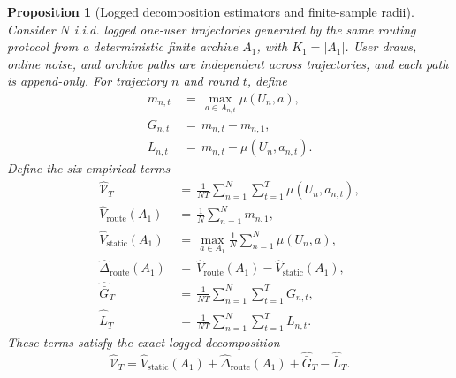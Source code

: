 \documentclass{article} %
\newtheorem{proposition}[theorem]{Proposition}
\begin{document}
\begin{proposition}[Logged decomposition estimators and finite-sample radii]
\label{prop:16}
Consider \(N\) i.i.d. logged one-user trajectories generated by the same
routing protocol from a deterministic finite archive \(A_1\), with
\(K_1=|A_1|\). User draws, online noise, and archive paths are independent
across trajectories, and each path is append-only. For trajectory \(n\) and
round \(t\), define
\begin{align}
\label{eq:app-six-logged-m}
m_{n,t}
&\,=\,
\max_{a\in A_{n,t}}\mu(U_n,a),
\\
\label{eq:app-six-logged-G}
G_{n,t}
&\,=\,
m_{n,t}-m_{n,1},
\\
\label{eq:app-six-logged-L}
L_{n,t}
&\,=\,
m_{n,t}-\mu(U_n,a_{n,t}).
\end{align}
Define the six empirical terms
\begin{align}
\label{eq:app-six-hat-value}
\widehat{\mathcal{V}}_T
&\,=\,
\frac{1}{NT}\sum_{n=1}^{N}\sum_{t=1}^{T}
\mu(U_n,a_{n,t}),
\\
\label{eq:app-six-hat-route}
\widehat V_{\mathrm{route}}(A_1)
&\,=\,
\frac{1}{N}\sum_{n=1}^{N}m_{n,1},
\\
\label{eq:app-six-hat-static}
\widehat V_{\mathrm{static}}(A_1)
&\,=\,
\max_{a\in A_1}
\frac{1}{N}\sum_{n=1}^{N}\mu(U_n,a),
\\
\label{eq:app-six-hat-het}
\widehat\Delta_{\mathrm{route}}(A_1)
&\,=\,
\widehat V_{\mathrm{route}}(A_1)
-\widehat V_{\mathrm{static}}(A_1),
\\
\label{eq:app-six-hat-G}
\widehat{\bar G}_T
&\,=\,
\frac{1}{NT}\sum_{n=1}^{N}\sum_{t=1}^{T}G_{n,t},
\\
\label{eq:app-six-hat-L}
\widehat{\bar L}_T
&\,=\,
\frac{1}{NT}\sum_{n=1}^{N}\sum_{t=1}^{T}L_{n,t}.
\end{align}
These terms satisfy the exact logged decomposition
\begin{equation}
\label{eq:app-six-sample-identity}
\widehat{\mathcal{V}}_T
=
\widehat V_{\mathrm{static}}(A_1)
+
\widehat\Delta_{\mathrm{route}}(A_1)
+
\widehat{\bar G}_T
-
\widehat{\bar L}_T.
\end{equation}


\end{proposition}
\end{document}
